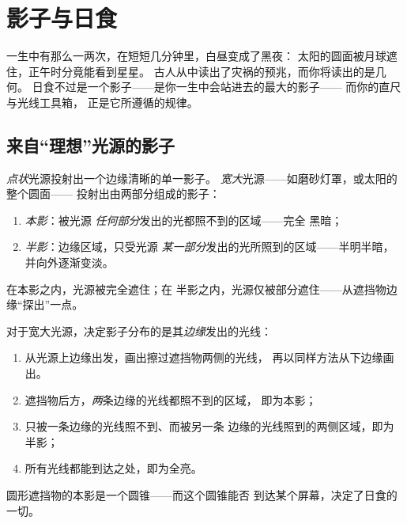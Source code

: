 \chapter{影子与日食}\label{ch:g7:shadows-eclipses}

一生中有那么一两次，在短短几分钟里，白昼变成了黑夜：
太阳的圆面被月球遮住，正午时分竟能看到星星。
古人从中读出了灾祸的预兆，而你将读出的是几何。
日食不过是一个影子——是你一生中会站进去的最大的影子——
而你的直尺与光线工具箱，
正是它所遵循的规律。

\section{来自“理想”光源的影子}

\begin{proposition}[本影与半影]\label{prop:g7:shadows-eclipses:umbra}
\emph{点状}光源投射出一个边缘清晰的单一影子。
\emph{宽大}光源——如磨砂灯罩，或太阳的整个圆面——
投射出由两部分组成的影子：
\begin{enumerate}
  \item \emph{本影}：被光源
        \emph{任何部分}发出的光都照不到的区域——完全
        黑暗；
  \item \emph{半影}：边缘区域，只受光源
        \emph{某一部分}发出的光所照到的区域——半明半暗，
        并向外逐渐变淡。
\end{enumerate}
在本影之内，光源被完全遮住；在
半影之内，光源仅被部分遮住——从遮挡物边缘“探出”一点。
\end{proposition}

\begin{method}[作出两种影子]\label{met:g7:shadows-eclipses:construct}
对于宽大光源，决定影子分布的是其\emph{边缘}发出的光线：
\begin{enumerate}
  \item 从光源上边缘出发，画出擦过遮挡物两侧的光线，
        再以同样方法从下边缘画出。
  \item 遮挡物后方，\emph{两}条边缘的光线都照不到的区域，
        即为本影；
  \item 只被一条边缘的光线照不到、而被另一条
        边缘的光线照到的两侧区域，即为半影；
  \item 所有光线都能到达之处，即为全亮。
\end{enumerate}
圆形遮挡物的本影是一个圆锥——而这个圆锥能否
到达某个屏幕，决定了日食的一切。
\end{method}

